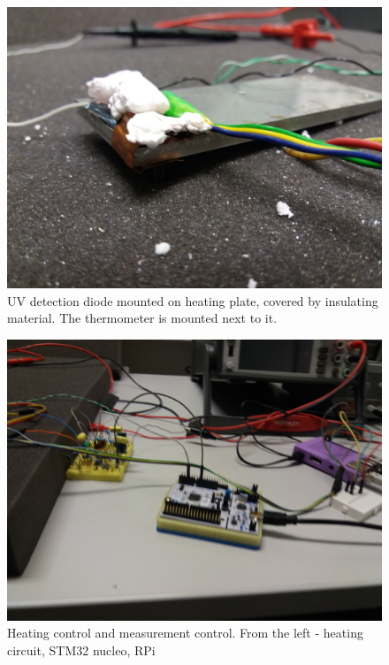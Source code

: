 \begin{figure}[H]
 \centering
 \includegraphics[scale=0.09, angle = 180]{./pictures/DiodeHeat}
 \caption{UV detection diode mounted on heating plate, covered by insulating material. The thermometer is mounted next to it.}
 \label{heatDiode}
\end{figure}


\begin{figure}[H]
 \centering
 \includegraphics[scale=0.09, angle = 180]{./pictures/heating}
 \caption{Heating control and measurement control. From the left - heating circuit, STM32 nucleo, RPi}
 \label{heating}
\end{figure}



